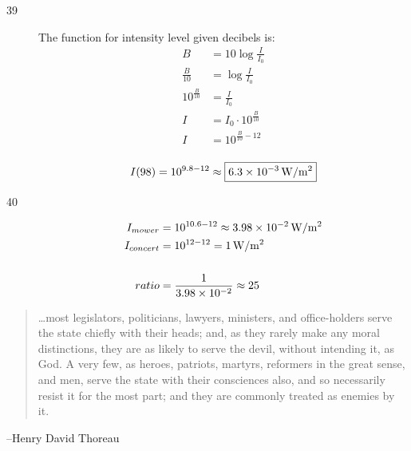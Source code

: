 \documentclass{exam}
\begin{document}
\begin{description}
      \item[39]
        The function for intensity level given decibels is:
        \begin{align*}
          B                 & = 10 \log \frac{I}{I_0} \\
          \frac{B}{10}      & = \log \frac{I}{I_0} \\
          10^{\frac{B}{10}} & = \frac{I}{I_0} \\
          I                 & = I_0 \cdot 10^{\frac{B}{10}} \\
          I                 & = 10^{\frac{B}{10} - 12} \\
        \end{align*}

        \[
          I(98) = 10^{9.8 - 12} \approx \boxed{ \unit[6.3 \times 10^{-3}]{W/m^2} }
        \]

      \item[40]
        \begin{align*}
          I_{mower}   & = 10^{10.6 - 12} \approx \unit[3.98 \times 10^{-2}]{W/m^2} \\
          I_{concert} & = 10^{12 - 12} = \unit[1]{W/m^2} \\
          \\
          ratio       & = \frac{1}{3.98 \times 10^{-2}} \approx 25 \\
        \end{align*}

    \end{description}

  \else
    \vspace{1 cm}
    \begin{quote}
      \begin{em}
        \ldots most legislators, politicians, lawyers, ministers, and office-holders serve the state chiefly with their
        heads; and, as they rarely make any moral distinctions, they are as likely to serve the devil, without intending
        it, as God. A very few, as heroes, patriots, martyrs, reformers in the great sense, and men, serve the state with
        their consciences also, and so necessarily resist it for the most part; and they are commonly treated as enemies
        by it.      
      \end{em}
    \end{quote}
    \hspace{1 cm} --Henry David Thoreau
  \fi


\end{document}
